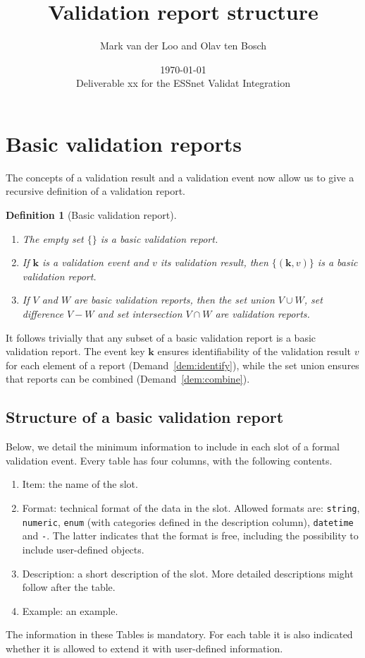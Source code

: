 \documentclass[a4paper, 11pt,titlepage]{article}
\title{Validation report structure}
\author{Mark van der Loo and Olav ten Bosch}
\date{\today\\
\vspace{1cm}
Deliverable xx for the ESSnet Validat Integration
}
\newtheorem{definition}{Definition}
\newcommand{\code}[1]{\texttt{#1}}
\newcommand{\la}[1]{\boldsymbol{#1}}
\begin{document}
\maketitle{}

\tableofcontents{}

\newpage






 
\section{Basic validation reports}
The concepts of a validation result and a validation event now allow us to 
give a recursive definition of a validation report.
%
\begin{definition}[Basic validation report]\leavevmode
\begin{enumerate}[topsep=0pt,itemsep=0pt]
\item The empty set $\{\}$ is a basic validation report.
\item If $\la{k}$ is a validation event and $v$ its validation result, then $\{(\la{k},v)\}$
is a basic validation report.
\item If $V$ and $W$ are basic validation reports, then the set union $V\cup
W$, set difference $V-W$ and set intersection $V\cap W$ are validation reports.
\end{enumerate}
\end{definition}
%
It follows trivially that any subset of a basic validation report is a
basic validation report. The event key $\la{k}$ ensures identifiability of the
validation result $v$ for each element of a report (Demand~\ref{dem:identify}),
while the set union ensures that reports can be combined
(Demand~\ref{dem:combine}).


\subsection{Structure of a basic validation report}
Below, we detail the minimum information to include in each slot of a formal 
validation event. Every table has four columns, with the following contents.
\begin{enumerate}
\item Item: the name of the slot.
\item Format: technical format of the data in the slot. Allowed formats are: \code{string},
\code{numeric}, \code{enum} (with categories defined in the description column), \code{datetime} and
\code{-}. The latter indicates that the format is free, including the possibility to include user-defined objects.
\item Description: a short description of the slot. More detailed descriptions
might follow after the table.
\item Example: an example.
\end{enumerate}
%
The information in these Tables is mandatory. For each table it is also
indicated whether it is allowed to extend it with user-defined information.
\end{document}
